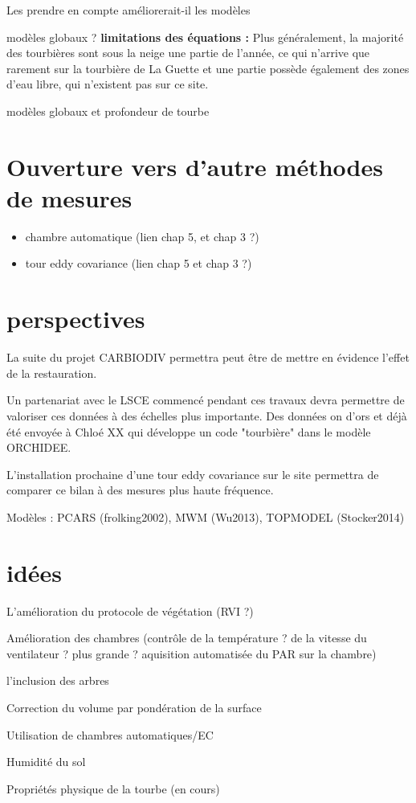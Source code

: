 Les prendre en compte améliorerait-il les modèles

modèles globaux ?
\textbf{limitations des équations :}
Plus généralement, la majorité des tourbières sont sous la neige une partie de l'année, ce qui n'arrive que rarement sur la tourbière de La Guette et une partie possède également des zones d'eau libre, qui n'existent pas sur ce site.

modèles globaux et profondeur de tourbe


\section*{Ouverture vers d'autre méthodes de mesures}
\begin{itemize}
\item chambre automatique (lien chap 5, et chap 3 ?)
\item tour eddy covariance (lien chap 5 et chap 3 ?)
\end{itemize}

\section*{perspectives}

La suite du projet CARBIODIV permettra peut être de mettre en évidence l'effet de la restauration.

Un partenariat avec le LSCE commencé pendant ces travaux devra permettre de valoriser ces données à des échelles plus importante.
Des données on d'ors et déjà été envoyée à Chloé XX qui développe un code "tourbière" dans le modèle ORCHIDEE.

L'installation prochaine d'une tour eddy covariance sur le site permettra de comparer ce bilan à des mesures plus haute fréquence.

Modèles : PCARS (frolking2002), MWM (Wu2013), TOPMODEL (Stocker2014)


\section*{idées}

L'amélioration du protocole de végétation (RVI ?)

Amélioration des chambres (contrôle de la température ? de la vitesse du ventilateur ? plus grande ? aquisition automatisée du PAR sur la chambre)

l'inclusion des arbres

Correction du volume par pondération de la surface

Utilisation de chambres automatiques/EC

Humidité du sol

Propriétés physique de la tourbe (en cours)

